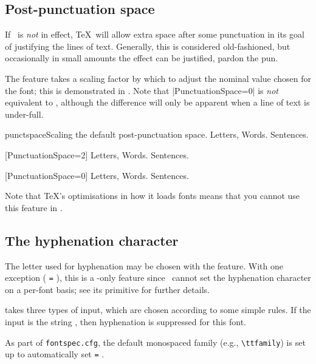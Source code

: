 \documentclass[a4paper]{l3doc}
\begin{document}
\subsection{Post-punctuation space}

If \cmd\frenchspacing\ is \emph{not} in effect, \TeX\ will allow extra
space after some punctuation in its goal of justifying the lines of text.
Generally, this is considered old-fashioned, but occasionally in small amounts the
effect can be justified, pardon the pun.

The  feature takes a scaling factor by which to
adjust the nominal value chosen for the font; this is demonstrated in
.
Note that |PunctuationSpace=0|
is \emph{not} equivalent to \cmd\frenchspacing, although the difference
will only be apparent when a line of text is under-full.

\begin{Lexample}{punctspace}{Scaling the default post-punctuation space.}
  \nonfrenchspacing
   Letters, Words. Sentences.          \par
  [PunctuationSpace=2]
   Letters, Words. Sentences.          \par
  [PunctuationSpace=0]
   Letters, Words. Sentences.
\end{Lexample}

Note that \TeX's optimisations in how it loads fonts means that you cannot
use this feature in .



\subsection{The hyphenation character}

The letter used for hyphenation may be chosen with the 
feature.
With one exception ( \texttt{=} ),
this is a \XeTeX-only feature since \LuaTeX\ cannot set the hyphenation character on a per-font basis;
see its  primitive for further details.

 takes three types of input, which are chosen according to some
simple rules. If the input is the string , then hyphenation is
suppressed for this font.

As part of \texttt{fontspec.cfg}, the default monospaced family (e.g., \verb|\ttfamily|)
is set up to automatically set  \texttt{=} .
\end{document}
